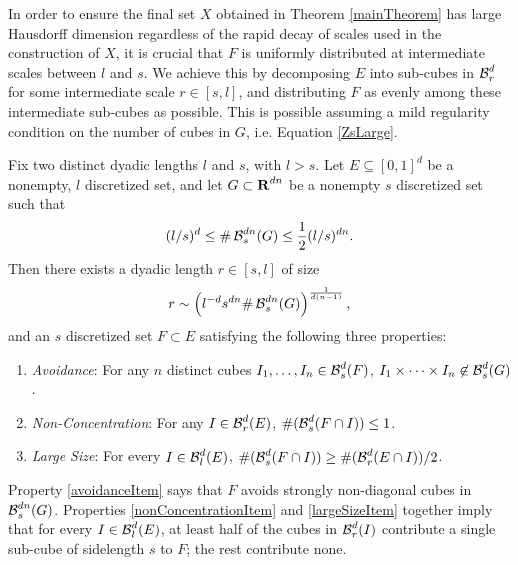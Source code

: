 In order to ensure the final set $X$ obtained in Theorem \ref{mainTheorem} has large Hausdorff dimension regardless of the rapid decay of scales used in the construction of $X$, it is crucial that $F$ is uniformly distributed at intermediate scales between $l$ and $s$.
We achieve this by decomposing $E$ into sub-cubes in $\operatorname{\mathcal{B}}^d_r$ for some intermediate scale $r \in [s,l]$, and distributing $F$ as evenly among these intermediate sub-cubes as possible. This is possible assuming a mild regularity condition on the number of cubes in $G$, i.e. Equation \eqref{ZsLarge}.
%

\begin{lemma} \label{discretelemma}
	Fix two distinct dyadic lengths $l$ and $s$, with $l > s$. Let $E \subseteq [0,1]^d$ be a nonempty, $l$ discretized set, and let $G\subset\operatorname{\mathbf{R}}^{dn}$ be a nonempty $s$ discretized set such that
	\begin{equation}\label{ZsLarge}
		(l/s)^d \leq \# \operatorname{\mathcal{B}}^{dn}_s(G)  \leq \frac{1}{2}(l/s)^{dn}.
	\end{equation} 
	Then there exists a dyadic length $r \in [s,l]$ of size
	\begin{equation} \label{rBound}
	 	r \sim \left( l^{-d}s^{dn} \# \operatorname{\mathcal{B}}^{dn}_s(G) \right)^{\frac{1}{d(n-1)}},
	\end{equation}
	and an $s$ discretized set $F \subset E$ satisfying the following three properties:
	\begin{enumerate}
		\item\label{avoidanceItem} \emph{Avoidance}: For any $n$ distinct cubes $I_1, \dots, I_n \in \operatorname{\mathcal{B}}^d_s(F)$, $I_1 \times \dots \times I_n \not \in \operatorname{\mathcal{B}}^d_s(G)$.

		\item\label{nonConcentrationItem} \emph{Non-Concentration}: For any $I \in \operatorname{\mathcal{B}}_r^d(E)$, $\#(\operatorname{\mathcal{B}}_s^d(F \cap I)) \leq 1$.

		\item\label{largeSizeItem} \emph{Large Size}: For every $I \in \operatorname{\mathcal{B}}^d_l(E)$, $\#(\operatorname{\mathcal{B}}^d_s(F \cap I)) \geq \#(\operatorname{\mathcal{B}}^d_r(E \cap I))/2$.
	\end{enumerate}
\end{lemma}

\begin{remark}
	Property \ref{avoidanceItem} says that $F$ avoids strongly non-diagonal cubes in $\operatorname{\mathcal{B}}^{dn}_s(G)$. Properties \ref{nonConcentrationItem} and \ref{largeSizeItem} together imply that for every $I \in \operatorname{\mathcal{B}}^d_l(E)$, at least half of the cubes in $\operatorname{\mathcal{B}}_r^d(I)$ contribute a single sub-cube of sidelength $s$ to $F$; the rest contribute none. 
\end{remark}

